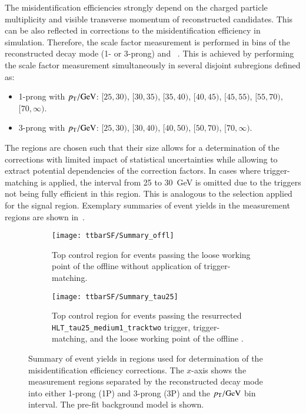 The \jettotauhadvis misidentification efficiencies strongly depend on
the charged particle multiplicity and visible transverse momentum of
reconstructed \tauhadvis candidates. This can be also reflected in
corrections to the \jettotauhadvis misidentification efficiency in
simulation. Therefore, the scale factor measurement is performed in
bins of the reconstructed \tauhadvis decay mode (1- or 3-prong) and
\tauhadvis~\pT. This is achieved by performing the scale factor
measurement simultaneously in several disjoint subregions defined as:
\begin{itemize}

\item 1-prong \tauhadvis with $\pT / \si{\GeV}$: $[25, 30)$, $[30, 35)$,
  $[35, 40)$, $[40, 45)$, $[45, 55)$, $[55, 70)$, $[70, \infty)$.

\item 3-prong \tauhadvis with $\pT / \si{\GeV}$: $[25, 30)$, $[30, 40)$,
  $[40, 50)$, $[50, 70)$, $[70, \infty)$.

\end{itemize}
The regions are chosen such that their size allows for a determination
of the corrections with limited impact of statistical uncertainties
while allowing to extract potential \pT dependencies of the correction
factors. In cases where trigger-matching is applied, the \tauhadvis
\pT interval from 25 to \SI{30}{\GeV} is omitted due to the triggers
not being fully efficient in this region. This is analogous to the
selection applied for the \hadhad signal region. Exemplary summaries
of event yields in the measurement regions are shown
in~.

\begin{figure}[htbp]
  \centering

  \begin{subfigure}[t]{.485\textwidth}
    \texttt{[image: ttbarSF/Summary\_offl]}
    \caption{Top control region for events passing the loose working
      point of the offline \tauid without application of
      trigger-matching.}
  \end{subfigure}\hfill%
  \begin{subfigure}[t]{.485\textwidth}
    \texttt{[image: ttbarSF/Summary\_tau25]}
    \caption{Top control region for events passing the resurrected
      \texttt{HLT\_tau25\_medium1\_tracktwo} trigger,
      trigger-matching, and the loose working point of the offline
      \tauid.}
  \end{subfigure}

  \caption{Summary of event yields in regions used for determination
    of the \jettotauhadvis misidentification efficiency
    corrections. The $x$-axis shows the measurement regions separated
    by the reconstructed decay mode into either 1-prong (1P) and
    3-prong (3P) \tauhadvis and the \tauhadvis $\pT /\si{\GeV}$ bin
    interval. The pre-fit background model is shown.}%
  \label{fig:ttbarsf_region_summary_prefit}
\end{figure}

